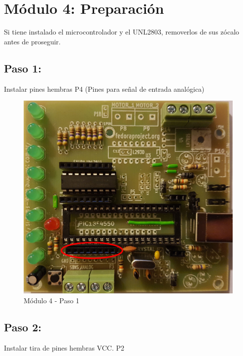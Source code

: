 \chapter{Módulo 4: Preparación}

Si tiene instalado el microcontrolador y el UNL2803, removerlos de sus zócalo antes de proseguir.

\section{Paso 1:}

Instalar pines hembras P4 (Pines para señal de entrada analógica)

\begin{figure}[h]
	\centering
	\includegraphics[width=0.8\linewidth]{Modulo_4/M4_1}
	\caption{Módulo 4 - Paso 1}
	\label{fig:M4_1}
\end{figure}

\newpage

\section{Paso 2:}

Instalar tira de pines hembras VCC. P2

